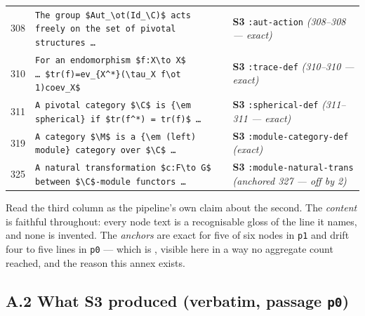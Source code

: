 \begin{center}
\begin{tabular}{r|p{}|p{}}
308 & \texttt{The group \$Aut\_\textbackslash ot(Id\_\textbackslash C)\$ acts freely on the set of pivotal structures \dots} & \textbf{S3} \texttt{:aut-action} \emph{(308--308 --- exact)}\\
310 & \texttt{For an endomorphism \$f:X\textbackslash to X\$ \dots\ \$tr(f)=ev\_\{X\^{}*\}(\textbackslash tau\_X f\textbackslash ot 1)coev\_X\$} & \textbf{S3} \texttt{:trace-def} \emph{(310--310 --- exact)}\\
311 & \texttt{A pivotal category \$\textbackslash C\$ is \{\textbackslash em spherical\} if \$tr(f\^{}*) = tr(f)\$ \dots} & \textbf{S3} \texttt{:spherical-def} \emph{(311--311 --- exact)}\\
319 & \texttt{A category \$\textbackslash M\$ is a \{\textbackslash em (left) module\} category over \$\textbackslash C\$ \dots} & \textbf{S3} \texttt{:module-}\linebreak\texttt{category-def} \emph{(exact)}\\
325 & \texttt{A natural transformation \$c:F\textbackslash to G\$ between \$\textbackslash C\$-module functors \dots} & \textbf{S3} \texttt{:module-natural-}\linebreak\texttt{trans} \emph{(anchored 327 --- off by 2)}\\
\hline
\end{tabular}
\end{center}

Read the third column as the pipeline's own claim about the second. The
\emph{content} is faithful throughout: every node text is a recognisable gloss
of the line it names, and none is invented. The \emph{anchors} are exact for
five of six nodes in \texttt{p1} and drift four to five lines in \texttt{p0} ---
which is , visible here in a way no aggregate count reached, and the
reason this annex exists.

\subsection*{A.2 What S3 produced (verbatim, passage \texttt{p0})}

